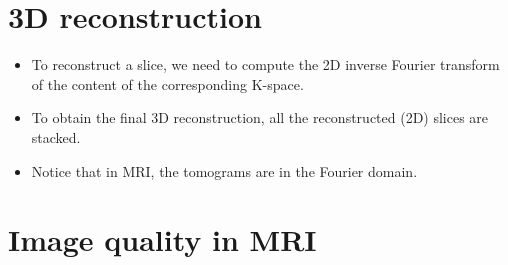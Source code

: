 \section{3D reconstruction}
\begin{itemize}
\item To reconstruct a slice, we need to compute the 2D inverse
  Fourier transform of the content of the corresponding K-space.
\item To obtain the final 3D reconstruction, all the reconstructed
  (2D) slices are stacked.
\item Notice that in MRI, the tomograms are in the Fourier domain.
\end{itemize}

\section{Image quality in \acrshort{MRI}}
